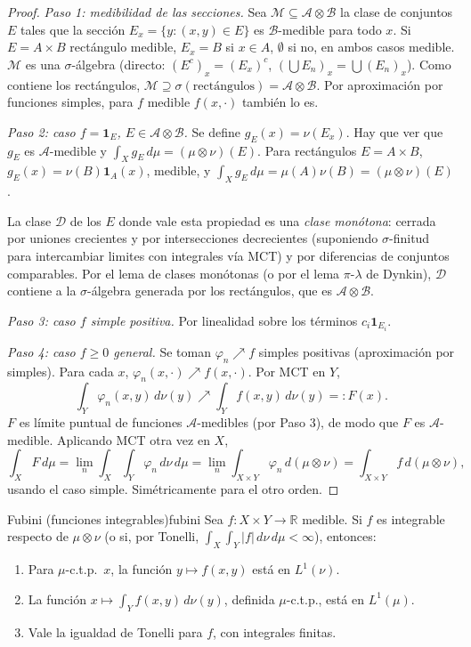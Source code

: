 \documentclass[11pt, a4paper]{article}
\begin{document}
\begin{proof}
\textit{Paso 1: medibilidad de las secciones.} Sea $\mathcal{M} \subseteq \mathcal{A} \otimes
\mathcal{B}$ la clase de conjuntos $E$ tales que la sección $E_x = \{y : (x, y) \in E\}$ es
$\mathcal{B}$-medible para todo $x$. Si $E = A \times B$ rectángulo medible, $E_x = B$ si
$x \in A$, $\emptyset$ si no, en ambos casos medible. $\mathcal{M}$ es una $\sigma$-álgebra
(directo: $(E^c)_x = (E_x)^c$, $(\bigcup E_n)_x = \bigcup (E_n)_x$). Como contiene los
rectángulos, $\mathcal{M} \supseteq \sigma(\text{rectángulos}) = \mathcal{A} \otimes
\mathcal{B}$. Por aproximación por funciones simples, para $f$ medible $f(x, \cdot)$ también lo
es.

\textit{Paso 2: caso $f = \mathbf{1}_E$, $E \in \mathcal{A} \otimes \mathcal{B}$.} Se define
$g_E(x) = \nu(E_x)$. Hay que ver que $g_E$ es $\mathcal{A}$-medible y $\int_X g_E \, d\mu = (\mu
\otimes \nu)(E)$. Para rectángulos $E = A \times B$, $g_E(x) = \nu(B) \mathbf{1}_A(x)$, medible,
y $\int_X g_E \, d\mu = \mu(A) \nu(B) = (\mu \otimes \nu)(E)$.

La clase $\mathcal{D}$ de los $E$ donde vale esta propiedad es una \emph{clase monótona}: cerrada
por uniones crecientes y por intersecciones decrecientes (suponiendo $\sigma$-finitud para
intercambiar limites con integrales vía MCT) y por diferencias de conjuntos comparables. Por el
lema de clases monótonas (o por el lema $\pi$-$\lambda$ de Dynkin), $\mathcal{D}$ contiene a la
$\sigma$-álgebra generada por los rectángulos, que es $\mathcal{A} \otimes \mathcal{B}$.

\textit{Paso 3: caso $f$ simple positiva.} Por linealidad sobre los términos
$c_i \mathbf{1}_{E_i}$.

\textit{Paso 4: caso $f \ge 0$ general.} Se toman $\varphi_n \nearrow f$ simples positivas
(aproximación por simples). Para cada $x$, $\varphi_n(x, \cdot) \nearrow f(x, \cdot)$. Por MCT en
$Y$,
$$ \int_Y \varphi_n(x, y) \, d\nu(y) \nearrow \int_Y f(x, y) \, d\nu(y) =: F(x). $$
$F$ es límite puntual de funciones $\mathcal{A}$-medibles (por Paso 3), de modo que $F$ es
$\mathcal{A}$-medible. Aplicando MCT otra vez en $X$,
$$ \int_X F \, d\mu = \lim_n \int_X \!\int_Y \varphi_n \, d\nu \, d\mu = \lim_n \int_{X \times Y}
\varphi_n \, d(\mu \otimes \nu) = \int_{X \times Y} f \, d(\mu \otimes \nu), $$
usando el caso simple. Simétricamente para el otro orden.
\end{proof}

\begin{teorema}{Fubini (funciones integrables)}{fubini}
Sea $f: X \times Y \to \mathbb{R}$ medible. Si $f$ es integrable respecto de $\mu \otimes \nu$
(o si, por Tonelli, $\int_X \int_Y |f| \, d\nu \, d\mu < \infty$), entonces:
\begin{enumerate}
    \item Para $\mu$-c.t.p.\ $x$, la función $y \mapsto f(x, y)$ está en $L^1(\nu)$.
    \item La función $x \mapsto \int_Y f(x, y) \, d\nu(y)$, definida $\mu$-c.t.p., está en
    $L^1(\mu)$.
    \item Vale la igualdad de Tonelli para $f$, con integrales finitas.
\end{enumerate}
\end{teorema}
\end{document}
